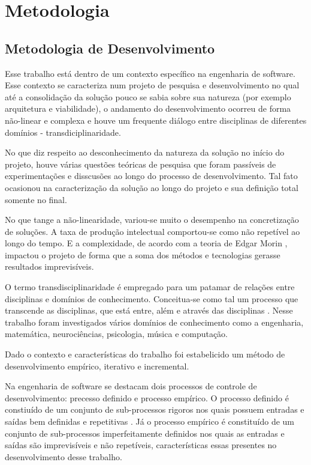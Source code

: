 \chapter{Metodologia}
\label{chap:metodologia}

\section{Metodologia de Desenvolvimento}
\label{sec:empirico}

Esse trabalho está dentro de um contexto específico na engenharia de software. Esse contexto se caracteriza num projeto de pesquisa e desenvolvimento no qual até a consolidação da solução pouco se sabia sobre sua natureza (por exemplo arquitetura e viabilidade), o andamento do desenvolvimento ocorreu de forma não-linear e complexa e houve um frequente diálogo entre disciplinas de diferentes domínios - transdiciplinaridade.

No que diz respeito ao desconhecimento da natureza da solução no início do projeto, houve várias questões teóricas de pesquisa que foram passíveis de experimentações e disscusões ao longo do processo de desenvolvimento. Tal fato ocasionou na caracterização da solução ao longo do projeto e sua definição total somente no final.

No que tange a não-linearidade, variou-se muito o desempenho na concretização de soluções. A taxa de produção intelectual comportou-se como não repetível ao longo do tempo. E a complexidade, de acordo com a teoria de Edgar Morin \cite{morin}, impactou o projeto de forma que a soma dos métodos e tecnologias gerasse resultados imprevisíveis.

O termo transdisciplinaridade é empregado para um patamar de relações entre disciplinas e domínios de conhecimento. Conceitua-se como tal um processo que transcende as disciplinas, que está entre, além e através das disciplinas \cite{criatividade}. Nesse trabalho foram investigados vários domínios de conhecimento como a engenharia, matemática, neurociências, psicologia, música e computação.

Dado o contexto e características do trabalho foi estabelicido um método de desenvolvimento empírico, iterativo e incremental. 

Na engenharia de software se destacam dois processos de controle de desenvolvimento: precesso definido e processo empírico. O processo definido é constiuído de um conjunto de sub-processos rigoros nos quais possuem entradas e saídas bem definidas e repetitivas \cite{rup}. Já o processo empírico é constituído de um conjunto de sub-processos imperfeitamente definidos nos quais as entradas e saídas são imprevisíveis e não repetíveis, características essas presentes no desenvolvimento desse trabalho.

